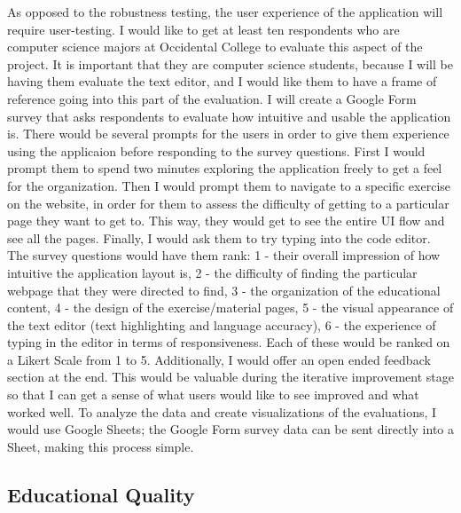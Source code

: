 \documentclass[10pt,twocolumn]{article}
\begin{document}
As opposed to the robustness testing, the user experience  of the application will 
require user-testing. I would like to get at least ten respondents who are computer science majors at Occidental College 
to evaluate this aspect of the project. It is important that they are computer science students, because I will be 
having them evaluate the text editor, and I would like them to have a frame of reference going into this part of the 
evaluation. I will create a Google Form survey that asks respondents to evaluate how 
intuitive and usable the application is. There would be several prompts for the users in order to give them experience using the applicaion 
before responding to the survey questions. First I would prompt them to spend two minutes exploring the application 
freely to get a feel for the organization. Then I would prompt them to navigate to a specific exercise on the website, 
in order for them to assess the difficulty of getting to a particular page they want to get to. This way, they would 
get to see the entire UI flow and see all the pages. Finally, I would ask 
them to try typing into the code editor. The survey questions would have them rank: 1 - their overall impression of how 
intuitive the application layout is, 2 - the difficulty of finding the particular webpage that they were directed to 
find, 3 - the organization of the educational content, 4 - the design of the exercise/material pages, 5 - the visual 
appearance of the text editor (text highlighting and language accuracy), 6 - the experience of 
typing in the editor in terms of responsiveness. Each of these would be ranked on a Likert Scale from 1 to 5. 
Additionally, I would offer an open ended feedback section at the end. This would be valuable during the iterative 
improvement stage so that I can get a sense of what users would like to see improved and what worked well. To analyze 
the data and create visualizations of the evaluations, I would use Google Sheets; the Google Form survey data can be 
sent directly into a Sheet, making this process simple. 

\subsection{Educational Quality}
\end{document}
